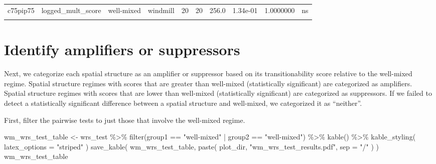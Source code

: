 \documentclass[
]{book}
\newenvironment{Shaded}{\begin{snugshade}}{\end{snugshade}}
\newcommand{\AttributeTok}[1]{\textcolor[rgb]{0.77,0.63,0.00}{#1}}
\newcommand{\FunctionTok}[1]{\textcolor[rgb]{0.00,0.00,0.00}{#1}}
\newcommand{\NormalTok}[1]{#1}
\newcommand{\OtherTok}[1]{\textcolor[rgb]{0.56,0.35,0.01}{#1}}
\newcommand{\SpecialCharTok}[1]{\textcolor[rgb]{0.00,0.00,0.00}{#1}}
\newcommand{\StringTok}[1]{\textcolor[rgb]{0.31,0.60,0.02}{#1}}
\begin{document}
\begin{table}
\begin{tabular}{l|l|l|l|r|r|r|r|r|l}
\hline
\cellcolor{gray!6}{c75pip75} & \cellcolor{gray!6}{logged\_mult\_score} & \cellcolor{gray!6}{well-mixed} & \cellcolor{gray!6}{wheel} & \cellcolor{gray!6}{20} & \cellcolor{gray!6}{20} & \cellcolor{gray!6}{229.0} & \cellcolor{gray!6}{4.45e-01} & \cellcolor{gray!6}{1.0000000} & \cellcolor{gray!6}{ns}\\
\hline
c75pip75 & logged\_mult\_score & well-mixed & windmill & 20 & 20 & 256.0 & 1.34e-01 & 1.0000000 & ns\\
\hline
\cellcolor{gray!6}{c75pip75} & \cellcolor{gray!6}{logged\_mult\_score} & \cellcolor{gray!6}{wheel} & \cellcolor{gray!6}{windmill} & \cellcolor{gray!6}{20} & \cellcolor{gray!6}{20} & \cellcolor{gray!6}{255.0} & \cellcolor{gray!6}{1.42e-01} & \cellcolor{gray!6}{1.0000000} & \cellcolor{gray!6}{ns}\\
\hline
\end{tabular}
\end{table}

\hypertarget{identify-amplifiers-or-suppressors}{%
\section{Identify amplifiers or suppressors}\label{identify-amplifiers-or-suppressors}}

Next, we categorize each spatial structure as an amplifier or suppressor based on
its transitionability score relative to the well-mixed regime.
Spatial structure regimes with scores that are greater than well-mixed (statistically significant) are categorized as amplifiers.
Spatial structure regimes with scores that are lower than well-mixed (statistically significant) are categorized as suppressors.
If we failed to detect a statistically significant difference between a spatial structure and well-mixed, we categorized it as ``neither''.

First, filter the pairwise tests to just those that involve the well-mixed regime.

\begin{Shaded}
\begin{Highlighting}[]
\NormalTok{wm\_wrs\_test\_table }\OtherTok{\textless{}{-}}\NormalTok{ wrs\_test }\SpecialCharTok{\%\textgreater{}\%}
  \FunctionTok{filter}\NormalTok{(group1 }\SpecialCharTok{==} \StringTok{"well{-}mixed"} \SpecialCharTok{|}\NormalTok{ group2 }\SpecialCharTok{==} \StringTok{"well{-}mixed"}\NormalTok{) }\SpecialCharTok{\%\textgreater{}\%}
  \FunctionTok{kable}\NormalTok{() }\SpecialCharTok{\%\textgreater{}\%}
  \FunctionTok{kable\_styling}\NormalTok{(}
    \AttributeTok{latex\_options =} \StringTok{"striped"}
\NormalTok{  )}
\FunctionTok{save\_kable}\NormalTok{(}
\NormalTok{  wm\_wrs\_test\_table,}
  \FunctionTok{paste}\NormalTok{(}
\NormalTok{    plot\_dir,}
    \StringTok{"wm\_wrs\_test\_results.pdf"}\NormalTok{,}
    \AttributeTok{sep =} \StringTok{"/"}
\NormalTok{  )}
\NormalTok{)}
\NormalTok{wm\_wrs\_test\_table}
\end{Highlighting}
\end{Shaded}
\end{document}
